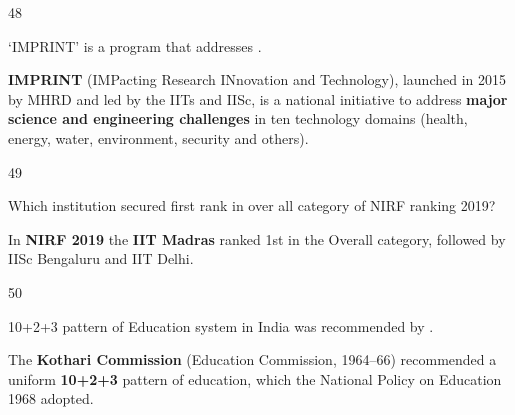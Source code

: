 \begin{question}{48}
{`IMPRINT' is a program that addresses \blank{}.\par}
\begin{explain}
\textbf{IMPRINT} (IMPacting Research INnovation and Technology), launched in 2015 by MHRD and led by the IITs and IISc, is a national initiative to address \textbf{major science and engineering challenges} in ten technology domains (health, energy, water, environment, security and others).
\end{explain}
\end{question}

\begin{question}{49}
{Which institution secured first rank in over all category of NIRF ranking 2019?\par}
\begin{explain}
In \textbf{NIRF 2019} the \textbf{IIT Madras} ranked 1st in the Overall category, followed by IISc Bengaluru and IIT Delhi.
\end{explain}
\end{question}

\begin{question}{50}
{10+2+3 pattern of Education system in India was recommended by \blank{}.\par}
\begin{explain}
The \textbf{Kothari Commission} (Education Commission, 1964--66) recommended a uniform \textbf{10+2+3} pattern of education, which the National Policy on Education 1968 adopted.
\end{explain}
\end{question}

